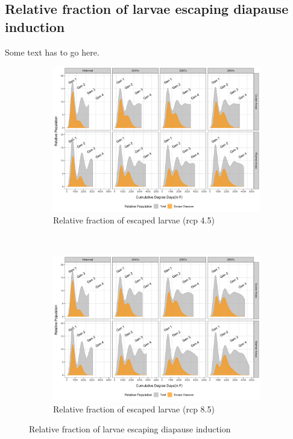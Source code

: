 \documentclass[12pt]{article}
\theoremstyle{plain}
\theoremstyle{definition}
\theoremstyle{definition}
\begin{document}
\subsection{Relative fraction of larvae escaping diapause induction}
Some text has to go here.
\begin{figure}[h!]
    \centering
    \begin{subfigure}[b]{0.45\textwidth}
        \includegraphics[width=\textwidth]{figures/diapause_rel_rcp45}
        \caption{\scriptsize  Relative fraction of escaped larvae (rcp 4.5)}
        \label{fig:RFED_45)}
    \end{subfigure}
    ~ %
    \begin{subfigure}[b]{0.45\textwidth}
        \includegraphics[width=\textwidth]{figures/diapause_rel_rcp85}
        \caption{\scriptsize Relative fraction of escaped larvae (rcp 8.5)}
        \label{fig:RFED_85}
    \end{subfigure}
    \caption{Relative fraction of larvae escaping diapause induction}\label{fig:RFLEDI}
\end{figure}
\end{document}
